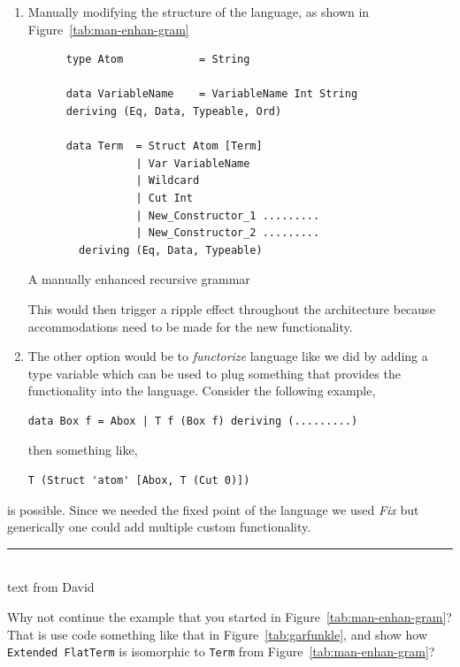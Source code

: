\documentclass[thesis-solanki.tex]{subfiles}
\begin{document}
\begin{enumerate}
\item Manually modifying the structure of the language, as shown in Figure~\ref{tab:man-enhan-gram}
  \begin{code-list}
    \begin{verbatim}
      type Atom            = String

      data VariableName    = VariableName Int String
      deriving (Eq, Data, Typeable, Ord)

      data Term  = Struct Atom [Term]
                 | Var VariableName
                 | Wildcard
                 | Cut Int
                 | New_Constructor_1 .........
                 | New_Constructor_2 .........
        deriving (Eq, Data, Typeable)
    \end{verbatim}
    \caption{A manually enhanced recursive grammar}
    \label{tab:man-enhan-gram}
  \end{code-list}

This would then trigger a ripple effect throughout the architecture because accommodations need to be made for the new functionality.

\item The other option would be to \textit{functorize} language like we did by adding a type variable which can be used to plug something that provides the functionality into the language.
Consider the following example,

\begin{verbatim}
data Box f = Abox | T f (Box f) deriving (.........)
\end{verbatim}

then something like,
\begin{verbatim}
T (Struct 'atom' [Abox, T (Cut 0)])
\end{verbatim}
\end{enumerate}
is possible. Since we needed the fixed point of the language we used \textit{Fix} but generically one could add multiple custom
functionality.

\begin{center}
  \textcolor{blue}{\rule{\0.95\textwidth}{0.2em}}\\[-1ex]
  text from David
\end{center}
Why not continue the example that you started in Figure~\ref{tab:man-enhan-gram}?
That is use code something like that in Figure~\ref{tab:garfunkle}, and show how
\Verb!Extended FlatTerm! is isomorphic to \Verb!Term! from Figure~\ref{tab:man-enhan-gram}?
\end{document}
